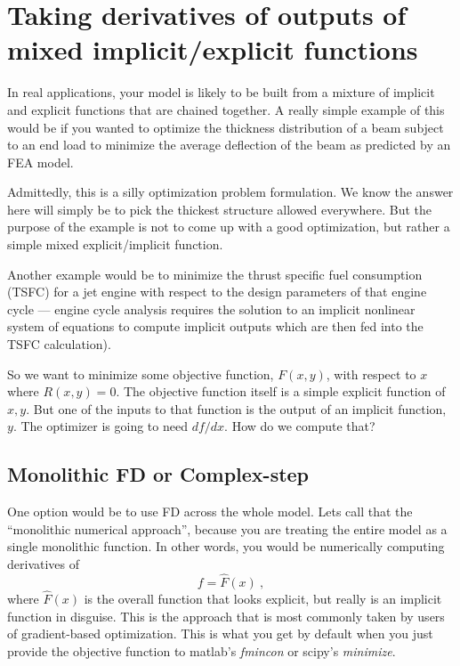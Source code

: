 \documentclass[conf]{new-aiaa}
\begin{document}
    \section{Taking derivatives of outputs of mixed implicit/explicit functions}

    In real applications, your model is likely to be built from a mixture of implicit and explicit functions that are chained together.
    A really simple example of this would be if you wanted to optimize the thickness distribution of a beam subject to an end load to minimize the average deflection of the beam as predicted by an FEA model. 
    
    Admittedly, this is a silly optimization problem formulation. 
    We know the answer here will simply be to pick the thickest structure allowed everywhere. 
    But the purpose of the example is not to come up with a good optimization, but rather a simple mixed explicit/implicit function. 
    
    Another example would be to minimize the thrust specific fuel consumption (TSFC) for a jet engine with respect to the design parameters of that engine cycle --- engine cycle analysis requires the solution to an implicit nonlinear system of equations to compute implicit outputs which are then fed into the TSFC calculation). 

    So we want to minimize some objective function, $F(x,y)$, with respect to $x$ where $R(x,y)=0$. 
    The objective function itself is a simple explicit function of $x,y$. 
    But one of the inputs to that function is the output of an implicit function, $y$. 
    The optimizer is going to need $df/dx$. 
    How do we compute that? 


    \subsection{Monolithic FD or Complex-step}
    One option would be to use FD across the whole model. 
    Lets call that the ``monolithic numerical approach'', because you are treating the entire model as a single monolithic function. 
    In other words, you would be numerically computing derivatives of 
    \begin{equation}
        f= \hat{F}(x) \ , 
    \end{equation}
    where $\hat{F}(x)$ is the overall function that looks explicit, but really is an implicit function in disguise. 
    This is the approach that is most commonly taken by users of gradient-based optimization. 
    This is what you get by default when you just provide the objective function to matlab's \textit{fmincon} or scipy's \textit{minimize}.
\end{document}
